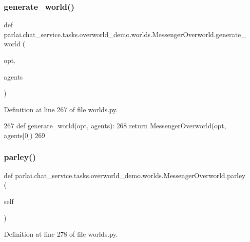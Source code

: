 \subsubsection{\texorpdfstring{generate\+\_\+world()}{generate\_world()}}
{\footnotesize\ttfamily def parlai.\+chat\+\_\+service.\+tasks.\+overworld\+\_\+demo.\+worlds.\+Messenger\+Overworld.\+generate\+\_\+world (\begin{DoxyParamCaption}\item[{}]{opt,  }\item[{}]{agents }\end{DoxyParamCaption})\hspace{0.3cm}{\ttfamily [static]}}



Definition at line 267 of file worlds.\+py.


\begin{DoxyCode}
267     \textcolor{keyword}{def }generate\_world(opt, agents):
268         \textcolor{keywordflow}{return} MessengerOverworld(opt, agents[0])
269 
\end{DoxyCode}
\mbox{\label{classparlai_1_1chat__service_1_1tasks_1_1overworld__demo_1_1worlds_1_1MessengerOverworld_aabe06743e0b3d25f1be871648075e748}} 
\subsubsection{\texorpdfstring{parley()}{parley()}}
{\footnotesize\ttfamily def parlai.\+chat\+\_\+service.\+tasks.\+overworld\+\_\+demo.\+worlds.\+Messenger\+Overworld.\+parley (\begin{DoxyParamCaption}\item[{}]{self }\end{DoxyParamCaption})}



Definition at line 278 of file worlds.\+py.


